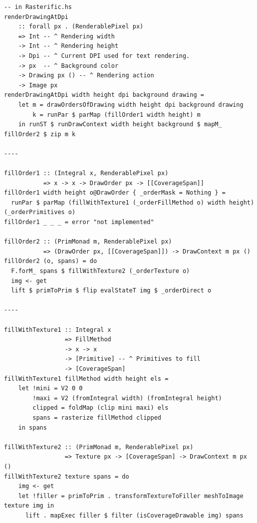 \documentclass[12pt, a4paper]{article}
\begin{document}
\begin{lstlisting}[label={lst:fillorder}, caption={Parallel fillOrder}]
-- in Rasterific.hs
renderDrawingAtDpi
    :: forall px . (RenderablePixel px)
    => Int -- ^ Rendering width
    -> Int -- ^ Rendering height
    -> Dpi -- ^ Current DPI used for text rendering.
    -> px  -- ^ Background color
    -> Drawing px () -- ^ Rendering action
    -> Image px
renderDrawingAtDpi width height dpi background drawing =
    let m = drawOrdersOfDrawing width height dpi background drawing
        k = runPar $ parMap (fillOrder1 width height) m
    in runST $ runDrawContext width height background $ mapM_ fillOrder2 $ zip m k

----

fillOrder1 :: (Integral x, RenderablePixel px)
           => x -> x -> DrawOrder px -> [[CoverageSpan]]
fillOrder1 width height o@DrawOrder { _orderMask = Nothing } =
  runPar $ parMap (fillWithTexture1 (_orderFillMethod o) width height) (_orderPrimitives o)
fillOrder1 _ _ _ = error "not implemented"

fillOrder2 :: (PrimMonad m, RenderablePixel px)
           => (DrawOrder px, [[CoverageSpan]]) -> DrawContext m px ()
fillOrder2 (o, spans) = do
  F.forM_ spans $ fillWithTexture2 (_orderTexture o)
  img <- get
  lift $ primToPrim $ flip evalStateT img $ _orderDirect o

----

fillWithTexture1 :: Integral x
                 => FillMethod
                 -> x -> x
                 -> [Primitive] -- ^ Primitives to fill
                 -> [CoverageSpan]
fillWithTexture1 fillMethod width height els =
    let !mini = V2 0 0
        !maxi = V2 (fromIntegral width) (fromIntegral height)
        clipped = foldMap (clip mini maxi) els
        spans = rasterize fillMethod clipped
    in spans

fillWithTexture2 :: (PrimMonad m, RenderablePixel px)
                 => Texture px -> [CoverageSpan] -> DrawContext m px ()
fillWithTexture2 texture spans = do
    img <- get
    let !filler = primToPrim . transformTextureToFiller meshToImage texture img in
      lift . mapExec filler $ filter (isCoverageDrawable img) spans
\end{lstlisting}
\end{document}
